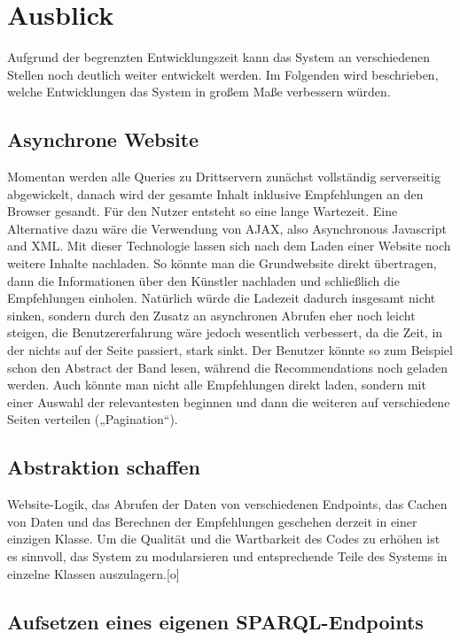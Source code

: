 \section{Ausblick}

Aufgrund der begrenzten Entwicklungszeit kann das System an verschiedenen Stellen noch deutlich weiter entwickelt werden. Im Folgenden wird beschrieben, welche Entwicklungen das System in großem Maße verbessern würden.


\subsection{Asynchrone Website}
Momentan werden alle Queries zu Drittservern zunächst vollständig serverseitig abgewickelt, danach wird der gesamte Inhalt inklusive Empfehlungen an den Browser gesandt. Für den Nutzer entsteht so eine lange Wartezeit.
Eine Alternative dazu wäre die Verwendung von AJAX, also Asynchronous Javascript and XML. Mit dieser Technologie lassen sich nach dem Laden einer Website noch weitere Inhalte nachladen. So könnte man die Grundwebsite direkt übertragen, dann die Informationen über den Künstler nachladen und schließlich die Empfehlungen einholen. Natürlich würde die Ladezeit dadurch insgesamt nicht sinken, sondern durch den Zusatz an asynchronen Abrufen eher noch leicht steigen, die Benutzererfahrung wäre jedoch wesentlich verbessert, da die Zeit, in der nichts auf der Seite passiert, stark sinkt. Der Benutzer könnte so zum Beispiel schon den Abstract der Band lesen, während die Recommendations noch geladen werden. Auch könnte man nicht alle Empfehlungen direkt laden, sondern mit einer Auswahl der relevantesten beginnen und dann die weiteren auf verschiedene Seiten verteilen („Pagination“).


\subsection{Abstraktion schaffen}


Website-Logik, das Abrufen der Daten von verschiedenen Endpoints, das Cachen von Daten und das Berechnen der Empfehlungen geschehen derzeit in einer einzigen Klasse. Um die Qualität und die Wartbarkeit des Codes zu erhöhen ist es sinnvoll, das System zu modularsieren und entsprechende Teile des Systems in einzelne Klassen auszulagern.[o]


\subsection{Aufsetzen eines eigenen SPARQL-Endpoints}


